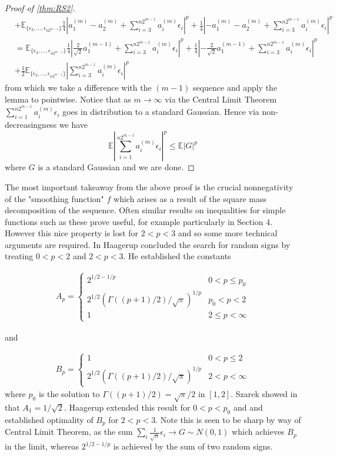 \documentclass[10pt]{article}
\newcommand{\E}{\mathbb{E}}
\newcommand{\1}{\textbf{1}}
\newcommand{\normOne}[1]{\left\lvert#1\right\rvert}
\theoremstyle{remark}
\theoremstyle{definition}
\begin{document}
\begin{proof}[Proof of \ref{thm:RS2}]
\begin{align*}
		&+\E_{\{\epsilon_3,...,\epsilon_{n2^{m-1}}\}}\frac{1}{4}\normOne{a_1^{(m)}-a_2^{(m)}+\sum_{i=3}^{n2^{m-1}}a_i^{(m)}\epsilon_i}^p+\frac{1}{4}\normOne{-a_1^{(m)}-a_2^{(m)}+\sum_{i=3}^{n2^{m-1}}a_i^{(m)}\epsilon_i}^p \\
		&= \E_{\{\epsilon_3,...,\epsilon_{n2^{m-1}}\}}\frac{1}{4}\normOne{\frac{2}{\sqrt{2}}a_1^{(m-1)}+\sum_{i=3}^{n2^{m-1}}a_i^{(m)}\epsilon_i}^p+\frac{1}{4}\normOne{-\frac{2}{\sqrt{2}}a_1^{(m-1)}+\sum_{i=3}^{n2^{m-1}}a_i^{(m)}\epsilon_i}^p \\
		&+ \frac{1}{2}\E_{\{\epsilon_3,...,\epsilon_{n2^{m-1}}\}}\normOne{\sum_{i=3}^{n2^{m-1}}a_i^{(m)}\epsilon_i}^p
	\end{align*} from which we take a difference with the $(m-1)$ sequence and apply the lemma to pointwise. Notice that as $m \to \infty$ via the Central Limit Theorem $\sum_{i=1}^{n2^{m-1}}a_i^{(m)}\epsilon_i$ goes in distribution to a standard Gaussian. Hence via non-decreasingness we have 
	\begin{equation*}
		\E\normOne{\sum_{i=1}^{n2^{m-1}}a_i^{(m)}\epsilon_i}^p \leq \E\normOne{G}^p 
	\end{equation*} where $G$ is a standard Gaussian and we are done.
\end{proof} 

The most important takeaway from the above proof is the crucial nonnegativity of the "smoothing function" $f$ which arises as a result of the square mass decomposition of the sequence. Often similar results on inequalities for simple functions such as these prove useful, for example particularly in Section 4. However this nice property is lost for $2 < p < 3$ and so some more technical arguments are required. In \cite{H} Haagerup concluded the search for random signs by treating $0 < p < 2$ and $2 < p < 3$. He established the constants


\begin{align}\label{eq:RS1}
	A_p = 
	\begin{cases}
		2^{1/2-1/p} & 0 < p \leq p_0 \\
		2^{1/2}(\Gamma((p+1)/2)/\sqrt{\pi})^{1/p} & p_0 < p < 2\\
		1 & 2 \leq p < \infty
	\end{cases}
\end{align}

and 

\begin{align}\label{eq:RS2}
	B_p = 
	\begin{cases}
		1 & 0 < p \leq 2\\
		2^{1/2}(\Gamma((p+1)/2)/\sqrt{\pi})^{1/p} & 2 < p < \infty
	\end{cases}
\end{align} where $p_0$ is the solution to $\Gamma((p+1)/2) = \sqrt{\pi}/2$ in $[1,2]$. Szarek showed in \cite{S} that $A_1 = 1/\sqrt{2}$. Haagerup extended this result for $0 < p < p_0$ and and established optimality of $B_p$ for $2 < p <3$. Note this is seen to be sharp by way of Central Limit Theorem, as the sum $\sum_i \frac{1}{\sqrt{n}}\epsilon_i \to G \sim N(0,1)$ which achieves $B_p$ in the limit, whereas $2^{1/2-1/p}$ is achieved by the sum of two random signs.
\end{document}
